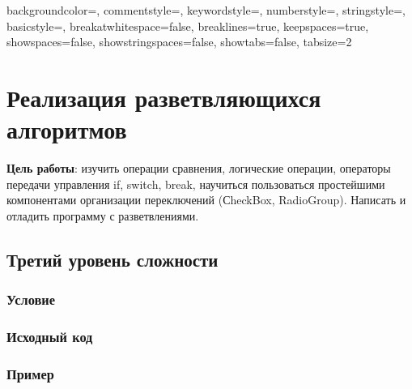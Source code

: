 
\usepackage{listings}
\usepackage{xcolor}


 {
    backgroundcolor=\color{backcolour}, commentstyle=\color{codegreen},
    keywordstyle=\color{codeblue},
    numberstyle=\tiny\color{codegray},
    stringstyle=\color{codeblue},
    basicstyle=\ttfamily\footnotesize,
    breakatwhitespace=false,         
    breaklines=true,                   
    keepspaces=true,             
    showspaces=false,                
    showstringspaces=false,
    showtabs=false,                  
    tabsize=2
}

\lstset{style=mystyle}





\section{Реализация разветвляющихся алгоритмов}

\textbf{Цель работы}: изучить операции сравнения, логические операции, 
операторы передачи управления if, switch, break, научиться пользоваться
простейшими компонентами организации переключений (СheckBox, RadioGroup).
Написать и отладить программу с разветвлениями.

\subsection{Третий уровень сложности}

\subsubsection{Условие}



\subsubsection{Исходный код}


\subsubsection{Пример}



